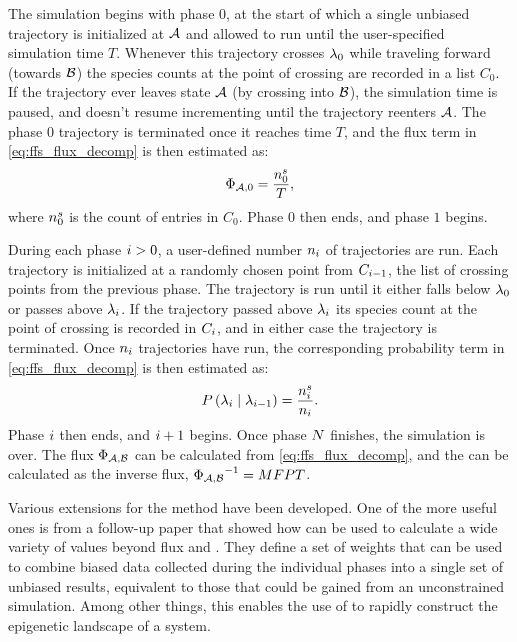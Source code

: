 The simulation begins with phase $0$, at the start of which a single unbiased trajectory is initialized at $\mathcal{A}$ and allowed to run until the user-specified simulation time $T$. Whenever this trajectory crosses ${\lambda}_{0}$ while traveling forward (\ie towards $\mathcal{B}$) the species counts at the point of crossing are recorded in a list $C_0$. If the trajectory ever leaves state $\mathcal{A}$ (\eg by crossing into $\mathcal{B}$), the simulation time is paused, and doesn't resume incrementing until the trajectory reenters $\mathcal{A}$. The phase $0$ trajectory is terminated once it reaches time $T$, and the flux term in \eqref{eq:ffs_flux_decomp} is then estimated as:
\begin{equation*}
    \Phi_{\mathcal{A}, 0} = \frac{n_{0}^{s}}{T},
\end{equation*}
where $n_{0}^{s}$ is the count of entries in $C_0$. Phase $0$ then ends, and phase $1$ begins.

During each phase $i>0$, a user-defined number $n_{i}$ of trajectories are run. Each trajectory is initialized at a randomly chosen point from $C_{i-1}$, the list of crossing points from the previous phase. The trajectory is run until it either falls below ${\lambda}_{0}$ or passes above ${\lambda}_{i}$. If the trajectory passed above ${\lambda}_{i}$ its species count at the point of crossing is recorded in $C_{i}$, and in either case the trajectory is terminated. Once $n_{i}$ trajectories have run, the corresponding probability term in \eqref{eq:ffs_flux_decomp} is then estimated as:
\begin{equation*}
    P\left(  {\lambda}_{i} \mid {\lambda}_{i - 1}  \right) = \frac{n_{i}^{s}}{n_{i}}.
\end{equation*}
Phase $i$ then ends, and $i+1$ begins. Once phase $N$ finishes, the  simulation is over. The flux $\Phi_{\mathcal{A}, \mathcal{B}}$ can be calculated from \eqref{eq:ffs_flux_decomp}, and the  can be calculated as the inverse flux, ${\Phi_{\mathcal{A}, \mathcal{B}}}^{-1} = MFPT$.

Various extensions for the  method have been developed. One of the more useful ones is from a follow-up paper\supercite{Valeriani:2007hv} that showed how  can be used to calculate a wide variety of values beyond flux and . They define a set of weights that can be used to combine biased data collected during the individual phases into a single set of unbiased results, equivalent to those that could be gained from an unconstrained  simulation. Among other things, this enables the use of  to rapidly construct the epigenetic landscape of a system.


